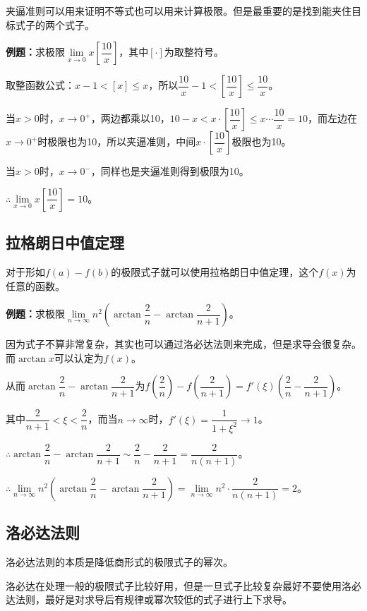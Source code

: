 \documentclass[UTF8, 12pt]{ctexart}
\begin{document}
夹逼准则可以用来证明不等式也可以用来计算极限。但是最重要的是找到能夹住目标式子的两个式子。\medskip

\textbf{例题：}求极限$\lim\limits_{x\to 0}x\left[\dfrac{10}{x}\right]$，其中$[\cdot]$为取整符号。

取整函数公式：$x-1<[x]\leqslant x$，所以$\dfrac{10}{x}-1<\left[\dfrac{10}{x}\right]\leqslant\dfrac{10}{x}$。

当$x>0$时，$x\to 0^+$，两边都乘以10，$10-x<x\cdot\left[\dfrac{10}{x}\right]\leqslant x\cdots\dfrac{10}{x}=10$，而左边在$x\to 0^+$时极限也为10，所以夹逼准则，中间$x\cdot\left[\dfrac{10}{x}\right]$极限也为10。\medskip

当$x>0$时，$x\to 0^-$，同样也是夹逼准则得到极限为10。\medskip

$\therefore \lim\limits_{x\to 0}x\left[\dfrac{10}{x}\right]=10$。

\subsection{拉格朗日中值定理}

对于形如$f(a)-f(b)$的极限式子就可以使用拉格朗日中值定理，这个$f(x)$为任意的函数。

\textbf{例题：}求极限$\lim\limits_{n\to\infty}n^2\left(\arctan\dfrac{2}{n}-\arctan\dfrac{2}{n+1}\right)$。\medskip

因为式子不算非常复杂，其实也可以通过洛必达法则来完成，但是求导会很复杂。而$\arctan x$可以认定为$f(x)$。

从而$\arctan\dfrac{2}{n}-\arctan\dfrac{2}{n+1}$为$f(\dfrac{2}{n})-f(\dfrac{2}{n+1})=f'(\xi)\left(\dfrac{2}{n}-\dfrac{2}{n+1}\right)$。

其中$\dfrac{2}{n+1}<\xi<\dfrac{2}{n}$，而当$n\to\infty$时，$f'(\xi)=\dfrac{1}{1+\xi^2}\to 1$。

$\therefore\arctan\dfrac{2}{n}-\arctan\dfrac{2}{n+1}\sim\dfrac{2}{n}-\dfrac{2}{n+1}=\dfrac{2}{n(n+1)}$。

$\therefore\lim\limits_{n\to\infty}n^2\left(\arctan\dfrac{2}{n}-\arctan\dfrac{2}{n+1}\right)=\lim\limits_{n\to\infty}n^2\cdot\dfrac{2}{n(n+1)}=2$。

\subsection{洛必达法则}

洛必达法则的本质是降低商形式的极限式子的幂次。

洛必达在处理一般的极限式子比较好用，但是一旦式子比较复杂最好不要使用洛必达法则，最好是对求导后有规律或幂次较低的式子进行上下求导。
\end{document}
